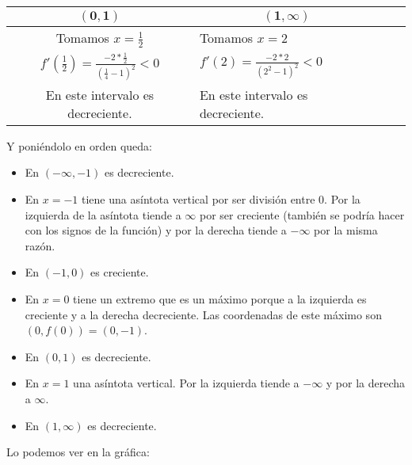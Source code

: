 \documentclass[a4paper,11pt,answers]{exam}
\newcommand\ddfrac[2]{\frac{\displaystyle #1}{\displaystyle #2}}
\begin{document}
\begin{questions}
\begin{solution}
\begin{small}
\begin{center}
\begin{tabular}{|Sl|Sl|}
\hline
{}                                                                                  & \\
\hline
 Tomamos $x=\frac{1}{2}$& Tomamos $x=2$                                  \\
 $f'(\frac{1}{2}) =\ddfrac{-2*\frac{1}{2}}{ \left(\frac{1}{4} - 1 \right)^2} < 0$ & $f'(2) =\frac{-2*2}{(2^2 - 1)^2}<0$\\
  En este intervalo es decreciente.& En este intervalo es decreciente.\\
  \hline
\end{tabular}
\end{center}
\end{small}
Y poniéndolo en orden queda:
\begin{itemize}
	\item En $(-\infty, -1)$ es decreciente.
	\item En $x= -1$ tiene una asíntota vertical por ser división entre 0. Por la izquierda de la asíntota tiende a $\infty$ por ser creciente (también se podría hacer con los signos de la función) y por la derecha tiende a $-\infty$ por la misma razón.
	\item En $(-1, 0)$ es creciente.
	\item En $x=0$ tiene un extremo que es un máximo porque a la izquierda es creciente y a la derecha decreciente. Las coordenadas de este máximo son $(0, f(0)) = (0, -1)$.
	\item En $(0, 1)$ es decreciente.
	\item En $x=1$ una asíntota vertical. Por la izquierda tiende a $-\infty$ y por la derecha a $\infty$.
	\item En $(1, \infty)$ es decreciente.
\end{itemize}

Lo podemos ver en la gráfica:
\begin{center}
\end{center}
\end{solution}
\end{questions}
\end{document}
